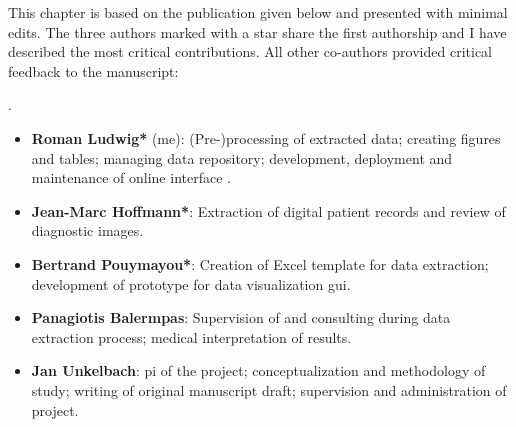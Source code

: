 \begin{tcolorbox}[
    title=\faIcon{users} Contributions,
    parbox=false,
    float
]
    This chapter is based on the publication given below and presented with minimal edits. The three authors marked with a star share the first authorship and I have described the most critical contributions. All other co-authors provided critical feedback to the manuscript:
    
    .

    \begin{itemize}[leftmargin=5.5mm]
        \item[\faIcon{user}] \textbf{Roman Ludwig*} (me): (Pre-)processing of extracted data; creating figures and tables; managing data repository; development, deployment and maintenance of online interface \inlinelyproxlogo{}.
        \item[\faIcon{user}] \textbf{Jean-Marc Hoffmann*}: Extraction of digital patient records and review of diagnostic images.
        \item[\faIcon{user}] \textbf{Bertrand Pouymayou*}: Creation of Excel template for data extraction; development of prototype for data visualization \acrshort{gui}.
        \item[\faIcon{user}] \textbf{Panagiotis Balermpas}: Supervision of and consulting during data extraction process; medical interpretation of results.
        \item[\faIcon{user}] \textbf{Jan Unkelbach}: \Gls{pi} of the project; conceptualization and methodology of study; writing of original manuscript draft; supervision and administration of project.
    \end{itemize}
\end{tcolorbox}
